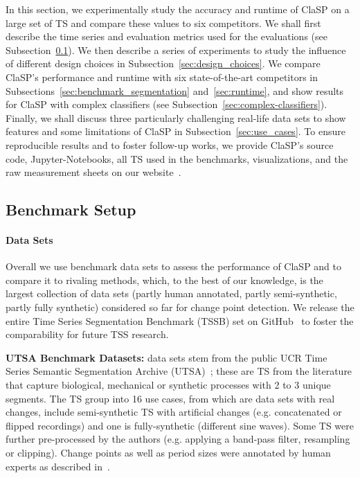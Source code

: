 \documentclass[pdflatex,sn-basic]{sn-jnl}
\begin{document}
In this section, we experimentally study the accuracy and runtime of ClaSP on a large set of TS and compare these values to six competitors. We shall first describe the time series and evaluation metrics used for the evaluations (see Subsection~\ref{sec:setup}). We then describe a series of experiments to study the influence of different design choices in Subsection~\ref{sec:design_choices}. We compare ClaSP’s performance and runtime with six state-of-the-art competitors in Subsections~\ref{sec:benchmark_segmentation} and~\ref{sec:runtime}, and show results for ClaSP with complex classifiers (see Subsection~\ref{sec:complex-classifiers}). Finally, we shall discuss three particularly challenging real-life data sets to show features and some limitations of ClaSP in Subsection~\ref{sec:use_cases}. To ensure reproducible results and to foster follow-up works, we provide ClaSP's source code, Jupyter-Notebooks, all TS used in the benchmarks, visualizations, and the raw measurement sheets on our website~\citep{ClaSPWebpage}.


\subsection{Benchmark Setup}
\label{sec:setup}

\paragraph{Data Sets}
Overall we use  benchmark data sets to assess the performance of ClaSP and to compare it to rivaling methods, which, to the best of our knowledge, is the largest collection of data sets (partly human annotated, partly semi-synthetic, partly fully synthetic) considered so far for change point detection. We release the entire Time Series Segmentation Benchmark (TSSB) set on GitHub~\citep{TSSBWebpage} to foster the comparability for future TSS research.

\textbf{UTSA Benchmark Datasets:}  data sets stem from the public UCR Time Series Semantic Segmentation Archive (UTSA)~\citep{gharghabi2017matrix}; these are TS from the literature that capture biological, mechanical or synthetic processes with 2 to 3 unique segments. The TS group into 16 use cases, from which  are data sets with real changes,  include semi-synthetic TS with artificial changes (e.g. concatenated or flipped recordings) and one is fully-synthetic (different sine waves). Some TS were further pre-processed by the authors (e.g. applying a band-pass filter, resampling or clipping). Change points as well as period sizes were annotated by human experts as described in~\citep{gharghabi2017matrix}.
\end{document}
